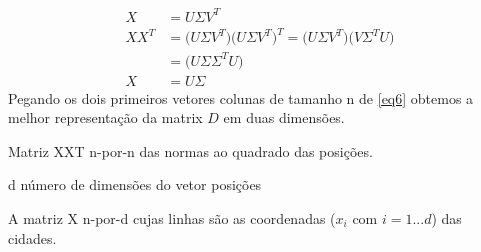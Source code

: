 \documentclass[aspectratio=169]{beamer}
\begin{document}
	\begin{frame}[t]
		\begin{align}\label{eq6}
			X &=  U \Sigma V^T\nonumber\\
			XX^T &=  \big(U \Sigma V^T\big)\big( U \Sigma V^T\big)^T = \big(U \Sigma V^T\big)\big( V \Sigma^T U\big)\nonumber\\
					 &=  \big(U \Sigma \Sigma^T U\big)\nonumber\\
				X   &= U \Sigma
		\end{align}
		Pegando os dois primeiros vetores colunas de tamanho n de \ref{eq6} obtemos a melhor representação da matrix $D$ em duas dimensões.
	\end{frame}
	\begin{frame}
		\begin{algorithm}[H]
			\DontPrintSemicolon
			\KwData
			{
				Matriz XXT n-por-n das normas ao quadrado das posições. \\ \par
				d n\'{u}mero de dimens\~{o}es do vetor posi\c{c}\~{o}es
			}
			\KwResult
			{
				A matriz X n-por-d cujas linhas s\~{a}o as coordenadas ($x_{i}$ com $i=1...d$) das cidades.
			}
		\end{algorithm}
			
	\end{frame}
\end{document}
